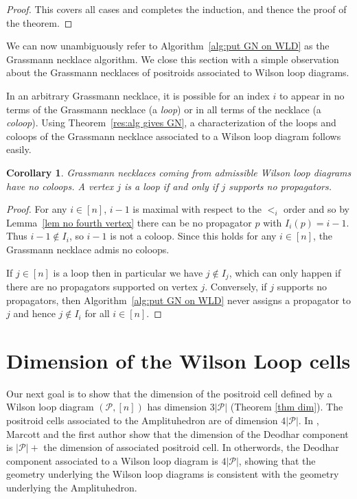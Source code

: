 \documentclass[11pt]{article}
\newcommand{\sanote}{\todo[color=violet!30]}
\newcommand{\cP}{\mathcal{P}}
\newtheorem{cor}[thm]{Corollary}
\theoremstyle{remark}
\theoremstyle{definition}
\begin{document}
\begin{proof}
This covers all cases and completes the induction, and thence the proof of the theorem.

\end{proof}


We can now unambiguously refer to Algorithm~\ref{alg:put GN on WLD} as the Grassmann necklace algorithm. We close this section with a simple observation about the Grassmann necklaces of positroids associated to Wilson loop diagrams.


In an arbitrary Grassmann necklace, it is possible for an index $i$ to appear in no terms of the Grassmann necklace (a {\em loop}) or in all terms of the necklace (a {\em coloop}). Using Theorem~\ref{res:alg gives GN}, a characterization of the loops and coloops of the Grassmann necklace associated to a Wilson loop diagram follows easily.


\begin{cor}\label{no coloops}\sanote{cite more prominently in frontmatter}
Grassmann necklaces coming from admissible Wilson loop diagrams have no coloops. A vertex $j$ is a loop if and only if $j$ supports no propagators. 
\end{cor}
\begin{proof}
For any $i \in [n]$, $i-1$ is maximal with respect to the $<_{i}$ order and so by Lemma~\ref{lem no fourth vertex} there can be no propagator $p$ with $I_{i}(p) = i-1$. Thus $i-1 \not\in I_{i}$, so $i-1$ is not a coloop. Since this holds for any $i \in [n]$, the Grassmann necklace admis no coloops.

If $j \in [n]$ is a loop then in particular we have $j \not\in I_j$, which can only happen if there are no propagators supported on vertex $j$. Conversely, if $j$ supports no propagators, then Algorithm~\ref{alg:put GN on WLD} never assigns a propagator to $j$ and hence $j \not\in I_i$ for all $i \in [n]$.
\end{proof}





\section{Dimension of the Wilson Loop cells}\label{sec dim}

Our next goal is to show that the dimension of the positroid cell defined by a Wilson loop diagram $(\cP, [n])$ has dimension $3|\cP|$ (Theorem \ref{thm dim}).  The positroid cells associated to the Amplituhedron are of dimension $4|\cP|$. In \cite{non-orientable}, Marcott and the first author show that the dimension of the Deodhar component is $|\cP| +$ the dimension of associated positroid cell. In otherwords, the Deodhar component associated to a Wilson loop diagram is $4|\cP|$, showing that the geometry underlying the Wilson loop diagrams is consistent with the geometry underlying the Amplituhedron.
\end{document}
